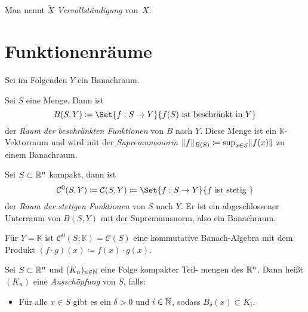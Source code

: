 \documentclass{cheat-sheet}
\newcommand{\K}{\mathbb{K}}
\begin{document}
\begin{definition}
  Man nennt $\widetilde{X}$ \emph{Vervollständigung} von~$X$.
\end{definition}

\section{Funktionenräume}

\begin{nota}
  Sei im Folgenden $Y$ ein Banachraum.
\end{nota}

\begin{definition}
  Sei $S$ eine Menge. Dann ist
  \[ B(S, Y) \coloneqq \Set{ f : S \to Y }{ f(S) \text { ist beschränkt in } Y } \]
  der \emph{Raum der beschränkten Funktionen} von $B$ nach $Y$. Diese Menge ist ein $\K$-Vektorraum und wird mit der \emph{Supremumsnorm} $\lVert f\rVert_{B(S)} \coloneqq \sup_{x \in S} \lVert f(x)\rVert$ zu einem Banachraum.
\end{definition}

\begin{definition}
  Sei $S \subset \mathbb{R}^n$ kompakt, dann ist
  \[ \mathcal{C}^0(S, Y) \coloneqq \mathcal{C}(S, Y) \coloneqq \Set{ f : S \to Y }{ f \text{ ist stetig } } \]
  der \emph{Raum der stetigen Funktionen} von $S$ nach $Y$. Er ist ein abgeschlossener Unterraum von $B(S, Y)$ mit der Supremumsnorm, also ein Banachraum.
\end{definition}


\begin{bem}
  Für $Y = \K$ ist $\mathcal{C}^0(S; \K) = \mathcal{C}(S)$ eine kommutative Banach-Algebra mit dem Produkt $(f \cdot g)(x) \coloneqq f(x) \cdot g(x)$.
\end{bem}

\begin{definition}
  Sei $S \subset \mathbb{R}^n$ und $(K_n)_{n \in \mathbb{N}}$ eine Folge kompakter Teil- mengen des $\mathbb{R}^n$. Dann heißt $(K_n)$ eine \emph{Ausschöpfung} von $S$, falls:
  \begin{itemize}
    \item Für alle $x \in S$ gibt es ein $\delta > 0$ und $i \in \mathbb{N}$, sodass $B_\delta(x) \subset K_i$.
    \\[-4pt]
  \end{itemize}
\end{definition}
\end{document}
